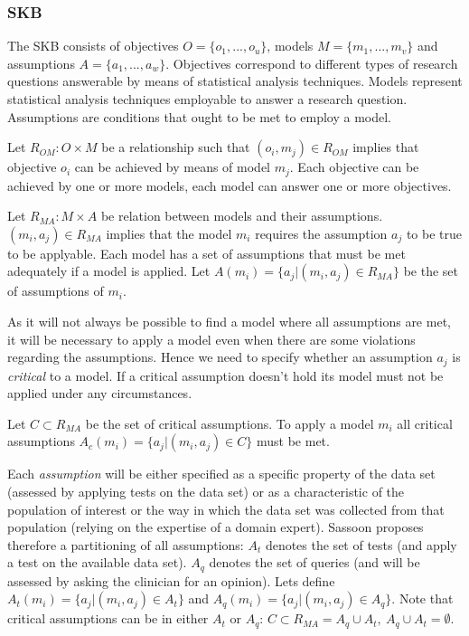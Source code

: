 
\subsubsection*{\Gls{SKB}}


The \gls{SKB} consists of objectives $O=\{o_1, ..., o_u\}$, models $M=\{m_1, ..., m_v\}$ and assumptions $A = \{a_1, ..., a_w\}$. Objectives correspond to different types of research questions answerable by means of statistical analysis techniques. Models represent statistical analysis techniques employable to answer a research question. Assumptions are conditions that ought to be met to employ a model.
\begin{definition}
	Let $R_{OM}: O \times M$ be a relationship such that $(o_i, m_j)\in R_{OM}$ implies that objective $o_i$ can be achieved by means of model $m_j$. Each objective can be achieved by one or more models, each model can answer one or more objectives.
\end{definition}

\begin{definition}
	Let $R_{MA}: M \times A$ be relation between models and their assumptions. $(m_i, a_j)\in R_{MA}$ implies that the model $m_i$ requires the assumption $a_j$ to be true to be applyable. Each model has a set of assumptions that must be met adequately if a model is applied. Let $A(m_i) = \{a_j | (m_i, a_j) \in R_{MA}\}$ be the set of assumptions of $m_i$.
\end{definition}

As it will not always be possible to find a model where all assumptions are met, it will be necessary to apply a model even when there are some violations regarding the assumptions. Hence we need to specify whether an assumption $a_j$ is \textit{critical} to a model. If a critical assumption doesn't hold its model must not be applied under any circumstances.

\begin{definition}
Let $C \subset R_{MA}$ be the set of critical assumptions. To apply a model $m_i$ all critical assumptions $A_c(m_i) = \{a_j | (m_i, a_j) \in C\}$ must be met.
\end{definition}

Each \textit{assumption} will be either specified as a specific property of the data set (assessed by applying tests on the data set) or as a characteristic of the population of interest or the way in which the data set was collected from that population (relying on the expertise of a domain expert). Sassoon proposes therefore a partitioning of all assumptions: $A_t$ denotes the set of tests (and apply a test on the available data set). $A_q$ denotes the set of queries (and will be assessed by asking the clinician for an opinion). Lets define $A_t(m_i)= \{a_j| (m_i, a_j) \in A_t\}$ and $A_q(m_i)= \{a_j| (m_i, a_j) \in A_q\}$. Note that critical assumptions can be in either $A_t$ or $A_q$: $C \subset R_{MA} = A_q \cup A_t, ~A_q \cup A_t = \emptyset$. 

